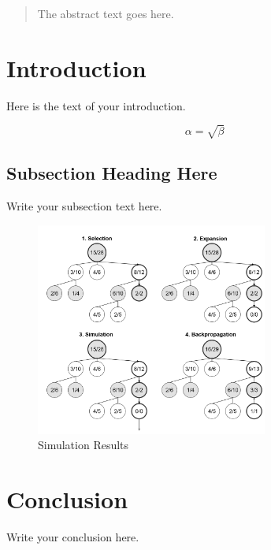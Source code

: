 \documentclass[12pt,final,twocolumn]{article}
\begin{document}


\begin{abstract}
The abstract text goes here.
\lipsum[1-6]
\end{abstract}

\section{Introduction}
Here is the text of your introduction.
\lipsum[1-6]

\begin{equation}
    \label{simple_equation}
    \alpha = \sqrt{ \beta }
\end{equation}

\subsection{Subsection Heading Here}
Write your subsection text here.
\lipsum[1-6]

\begin{figure}
    \centering
    \includegraphics[width=3.0in]{img/test_fig}
    \caption{Simulation Results}
    \label{simulationfigure}
\end{figure}

\section{Conclusion}
Write your conclusion here.
\lipsum[1-6]
\end{document}
